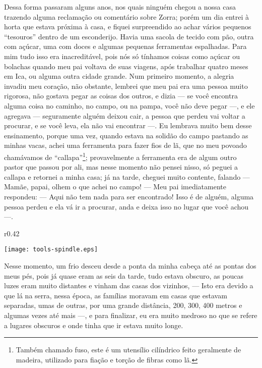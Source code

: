 Dessa forma passaram alguns anos, nos quais ninguém chegou a nossa casa trazendo alguma reclamação ou comentário sobre Zorra; porém um dia entrei à horta que estava próxima à casa, e fiquei surpreendido ao achar vários pequenos ``tesouros'' dentro de um esconderijo. Havia uma sacola de tecido com pão, outra com açúcar, uma com doces e algumas pequenas ferramentas espalhadas. 
Para mim tudo isso era inacreditável, pois nós só tínhamos coisas como açúcar ou bolachas quando meu pai voltava de suas viagens, após trabalhar quatro meses em Ica, ou alguma outra cidade grande.
Num primeiro momento, a alegria invadiu meu coração, não obstante, lembrei que meu pai era uma pessoa muito rigorosa, não gostava pegar as coisas dos outros, e dizia --- se você encontra alguma coisa no caminho, no campo, ou na pampa, você não deve pegar ---, e ele agregava --- seguramente alguém deixou cair, a pessoa que perdeu vai voltar a procurar, e se você leva, ela não vai encontrar ---. 
Eu lembrava muito bem desse ensinamento, porque uma vez, quando estava na solidão do campo pastando as minhas vacas, achei uma ferramenta para fazer fios de lã, que no meu povoado chamávamos de ``callapa''\footnote{Também chamado fuso, este é um utensílio cilíndrico feito geralmente de madeira, utilizado para fiação e torção de fibras como lã.}; provavelmente a ferramenta era de algum outro pastor que passou por ali, mas nesse momento não pensei nisso, só peguei a callapa e retornei a minha casa; já na tarde, cheguei  muito contente, falando --- Mamãe, papai, olhem o que achei no campo! --- 
Meu pai imediatamente respondeu: --- Aqui não tem nada para ser encontrado! Isso é de alguém, alguma pessoa perdeu e ela vá ir a procurar, anda e deixa isso no lugar que você achou ---. 
\begin{wrapfigure}{r}{0.42\textwidth}
  \begin{center}
  \vspace{-10pt}
    \texttt{[image: tools-spindle.eps]}
  \end{center}
  \vspace{-20pt}
\end{wrapfigure}
Nesse momento, um frio desceu desde a ponta da minha cabeça até as pontas dos meus pés, pois já quase eram as seis da tarde, tudo estava obscuro, as poucas luzes eram muito distantes e vinham das casas dos vizinhos, --- Isto era devido a que lá na serra, nessa época, as famílias moravam em casas que estavam separadas, umas de outras, por uma grande distância, 200, 300, 400 metros e algumas vezes até mais  ---, e para finalizar, eu era muito medroso no que se refere a lugares obscuros e onde tinha que ir estava muito longe.


